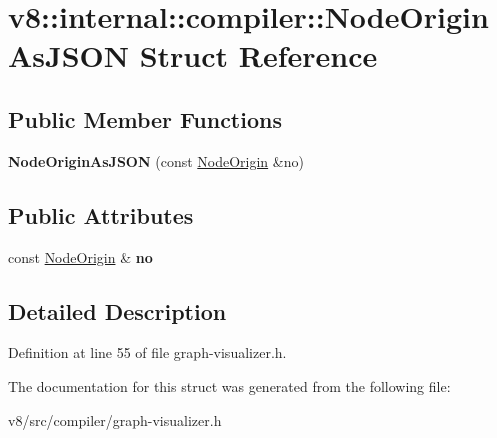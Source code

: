 \hypertarget{structv8_1_1internal_1_1compiler_1_1NodeOriginAsJSON}{}\section{v8\+:\+:internal\+:\+:compiler\+:\+:Node\+Origin\+As\+J\+S\+ON Struct Reference}
\label{structv8_1_1internal_1_1compiler_1_1NodeOriginAsJSON}
\subsection*{Public Member Functions}
\begin{DoxyCompactItemize}
\item 
\mbox{\label{structv8_1_1internal_1_1compiler_1_1NodeOriginAsJSON_a111537c38d37f3f4ce7bf99085299bd1}} 
{\bfseries Node\+Origin\+As\+J\+S\+ON} (const \mbox{\hyperlink{classv8_1_1internal_1_1compiler_1_1NodeOrigin}{Node\+Origin}} \&no)
\end{DoxyCompactItemize}
\subsection*{Public Attributes}
\begin{DoxyCompactItemize}
\item 
\mbox{\label{structv8_1_1internal_1_1compiler_1_1NodeOriginAsJSON_a07d6b9fcbdf051fa56ae32b5d9596ede}} 
const \mbox{\hyperlink{classv8_1_1internal_1_1compiler_1_1NodeOrigin}{Node\+Origin}} \& {\bfseries no}
\end{DoxyCompactItemize}


\subsection{Detailed Description}


Definition at line 55 of file graph-\/visualizer.\+h.



The documentation for this struct was generated from the following file\+:\begin{DoxyCompactItemize}
\item 
v8/src/compiler/graph-\/visualizer.\+h\end{DoxyCompactItemize}
